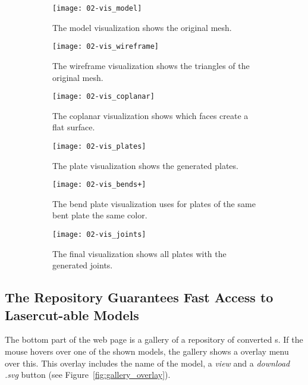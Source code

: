 \documentclass[../ClassicThesis.tex]{subfiles}
\begin{document}
\begin{figure}
    \centering
    \begin{subfigure}[t]{0.49\textwidth}
      \centering
      \texttt{[image: 02-vis\_model]}
      \caption{The model visualization shows the original mesh.}
    \end{subfigure}
    \begin{subfigure}[t]{0.49\textwidth}
      \centering
      \texttt{[image: 02-vis\_wireframe]}
      \caption{The wireframe visualization shows the triangles of the original mesh.}
    \end{subfigure}
    \begin{subfigure}[t]{0.49\textwidth}
      \centering
      \texttt{[image: 02-vis\_coplanar]}
      \caption{The coplanar visualization shows which faces create a flat surface.}
    \end{subfigure}
    \begin{subfigure}[t]{0.49\textwidth}
      \centering
      \texttt{[image: 02-vis\_plates]}
      \caption{The plate visualization shows the generated plates.}
    \end{subfigure}
    \begin{subfigure}[t]{0.49\textwidth}
      \centering
      \texttt{[image: 02-vis\_bends+]}
      \caption{The bend plate visualization uses for plates of the same bent plate the same color.}
    \end{subfigure}
    \begin{subfigure}[t]{0.49\textwidth}
      \centering
      \texttt{[image: 02-vis\_joints]}
      \caption{The final visualization shows all plates with the generated joints.}
    \end{subfigure}
    \caption{}
    \label{fig:visualization_selection}
\end{figure}

\subsection{The Repository Guarantees Fast Access to Lasercut-able Models}

The bottom part of the web page is a gallery of a repository of converted \threedmodel s. If the mouse hovers over one of the shown models, the gallery shows a overlay menu over this. This overlay includes the name of the model, a \emph{view} and a \emph{download .svg} button (see Figure~\ref{fig:gallery_overlay}).
\end{document}
